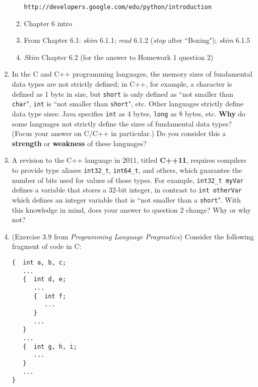 \documentclass[9pt]{article}
\begin{document}
\begin{enumerate}
\begin{enumerate}
                  \verb|http://developers.google.com/edu/python/introduction|
            \item Chapter 6 intro
            \item From Chapter 6.1: \textit{skim} 6.1.1; \textit{read} 6.1.2
                  (\textit{stop} after ``Boxing"); \textit{skim} 6.1.5
            \item \textit{Skim} Chapter 6.2 (for the answer to Homework 1
                  question 2)
         \end{enumerate}
   \item In the C and C++ programming languages, the memory sizes of fundamental
         data types are not strictly defined; in C++, for example, a character
         is defined as 1 byte in size, but \verb|short| is only defined as ``not
         smaller than \verb|char|", \verb|int| is ``not smaller than
         \verb|short|", etc. Other languages strictly define data type sizes:
         Java specifies \verb|int| as 4 bytes, \verb|long| as 8 bytes, etc.
         \textbf{Why} do some languages not strictly define the sizes of
         fundamental data types? (Focus your answer on C/C++ in particular.) Do
         you consider this a \textbf{strength} or \textbf{weakness} of these
         languages?
   \item A revision to the C++ language in 2011, titled \textbf{C++11}, requires
         compilers to provide type aliases \verb|int32_t|, \verb|int64_t|, and
         others, which guarantee the number of bits used for values of those
         types. For example, \verb|int32_t myVar| defines a variable that stores
         a 32-bit integer, in contrast to \verb|int otherVar| which defines an
         integer variable that is ``not smaller than a \verb|short|". With this
         knowledge in mind, does your answer to question 2 change? Why or why
         not?
   \item (Exercise 3.9 from \textit{Programming Language Pragmatics}) Consider
         the following fragment of code in C:
         \begin{verbatim}
{  int a, b, c;
   ...
   {  int d, e;
      ...
      {  int f;
         ...
      }
      ...
   }
   ...
   {  int g, h, i;
      ...
   }
   ...
}
         \end{verbatim}

\end{enumerate}
\end{document}
